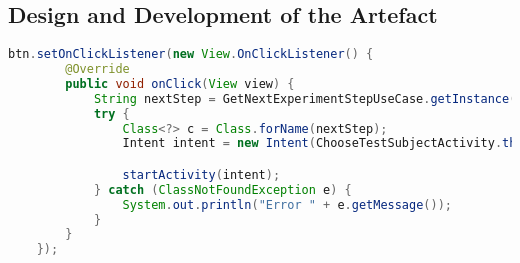 \newpage\subsection*{Design and Development of the Artefact}\label{appendix:devArt}

\begin{lstlisting}[language=java,label=activity_call_on_btn_press,lineskip={0pt}, caption=Activity call on button press, basicstyle=\scriptsize, captionpos=b]
    btn.setOnClickListener(new View.OnClickListener() {
        @Override
        public void onClick(View view) {
            String nextStep = GetNextExperimentStepUseCase.getInstance().getNextExperimentStep();
            try {
                Class<?> c = Class.forName(nextStep);
                Intent intent = new Intent(ChooseTestSubjectActivity.this, c);

                startActivity(intent);
            } catch (ClassNotFoundException e) {
                System.out.println("Error " + e.getMessage());
            }
        }
    });
\end{lstlisting}
